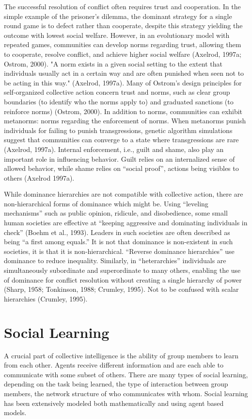 The successful resolution of conflict often requires trust and cooperation. In the simple example of the prisoner's dilemma, the dominant strategy for a single round game is to defect rather than cooperate, despite this strategy yielding the outcome with lowest social welfare. However, in an evolutionary model with repeated games, communities can develop norms regarding trust, allowing them to cooperate, resolve conflict, and achieve higher social welfare (Axelrod, 1997a; Ostrom, 2000). "A norm exists in a given social setting to the extent that individuals usually act in a certain way and are often punished when seen not to be acting in this way." (Axelrod, 1997a). Many of Ostrom's design principles for self-organized collective action concern trust and norms, such as clear group boundaries (to identify who the norms apply to) and graduated sanctions (to reinforce norms) (Ostrom, 2000). In addition to norms, communities can exhibit metanorms: norms regarding the enforcement of norms. When metanorms punish individuals for failing to punish transgressions, genetic algorithm simulations suggest that communities can converge to a state where transgressions are rare (Axelrod, 1997a). Internal enforcement, i.e., guilt and shame, also play an important role in influencing behavior. Guilt relies on an internalized sense of allowed behavior, while shame relies on ``social proof'', actions being visibles to others (Axelrod 1997a).

While dominance hierarchies are not compatible with collective action, there are non-hierarchical forms of dominance which might be. Using ``leveling mechanisms'' such as public opinion, ridicule, and disobedience, some small human societies are effective at ``keeping aggressive and dominating individuals in check'' (Boehm et al., 1993). Leaders in such societies are often described as being ``a first among equals.'' It is not that dominance is non-existent in such societies, it is that it is non-hierarchical. ``Reverse dominance hierarchies'' use dominance to reduce inequality. Similarly, in ``heterarchies'' individuals are simultaneously subordinate and superordinate to many others, enabling the use of dominance for conflict resolution without creating a single hierarchy of power (Sharp, 1958; Tonkinson, 1988; Crumley, 1995). Not to be confused with scalar hierarchies (Crumley, 1995).

\section{Social Learning}\label{sec:social-learning}
A crucial part of collective intelligence is the ability of group members to learn from each other. Agents receive different information and are each able to communicate with some subset of others. There are many types of social learning, depending on the task being learned, the type of interaction between group members, the network structure of who communicates with whom. Social learning has been extensively modeled both mathematically and using agent based models.

